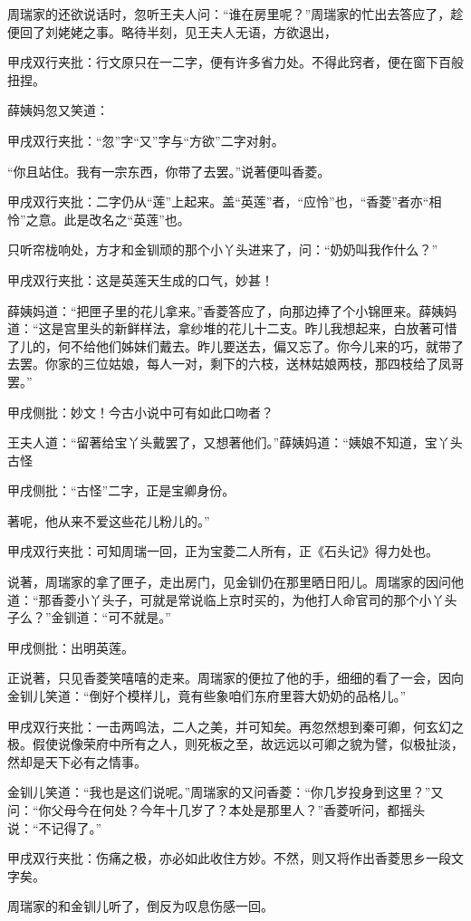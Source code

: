 \begin{parag}
    周瑞家的还欲说话时，忽听王夫人问：“谁在房里呢？”周瑞家的忙出去答应了，趁便回了刘姥姥之事。略待半刻，见王夫人无语，方欲退出，\begin{note}甲戌双行夹批：行文原只在一二字，便有许多省力处。不得此窍者，便在窗下百般扭捏。\end{note}薛姨妈忽又笑道：\begin{note}甲戌双行夹批：“忽”字“又”字与“方欲”二字对射。\end{note}“你且站住。我有一宗东西，你带了去罢。”说著便叫香菱。\begin{note}甲戌双行夹批：二字仍从“莲”上起来。盖“英莲”者，“应怜”也，“香菱”者亦“相怜”之意。此是改名之“英莲”也。\end{note}只听帘栊响处，方才和金钏顽的那个小丫头进来了，问：“奶奶叫我作什么？”\begin{note}甲戌双行夹批：这是英莲天生成的口气，妙甚！\end{note}薛姨妈道：“把匣子里的花儿拿来。”香菱答应了，向那边捧了个小锦匣来。薛姨妈道：“这是宫里头的新鲜样法，拿纱堆的花儿十二支。昨儿我想起来，白放著可惜了儿的，何不给他们姊妹们戴去。昨儿要送去，偏又忘了。你今儿来的巧，就带了去罢。你家的三位姑娘，每人一对，剩下的六枝，送林姑娘两枝，那四枝给了凤哥罢。”\begin{note}甲戌侧批：妙文！今古小说中可有如此口吻者？\end{note}王夫人道：“留著给宝丫头戴罢了，又想著他们。”薛姨妈道：“姨娘不知道，宝丫头古怪\begin{note}甲戌侧批：“古怪”二字，正是宝卿身份。\end{note}著呢，他从来不爱这些花儿粉儿的。”\begin{note}甲戌双行夹批：可知周瑞一回，正为宝菱二人所有，正《石头记》得力处也。\end{note}
\end{parag}


\begin{parag}
    说著，周瑞家的拿了匣子，走出房门，见金钏仍在那里晒日阳儿。周瑞家的因问他道：“那香菱小丫头子，可就是常说临上京时买的，为他打人命官司的那个小丫头子么？”金钏道：“可不就是。”\begin{note}甲戌侧批：出明英莲。\end{note}正说著，只见香菱笑嘻嘻的走来。周瑞家的便拉了他的手，细细的看了一会，因向金钏儿笑道：“倒好个模样儿，竟有些象咱们东府里蓉大奶奶的品格儿。”\begin{note}甲戌双行夹批：一击两鸣法，二人之美，并可知矣。再忽然想到秦可卿，何玄幻之极。假使说像荣府中所有之人，则死板之至，故远远以可卿之貌为譬，似极扯淡，然却是天下必有之情事。\end{note}金钏儿笑道：“我也是这们说呢。”周瑞家的又问香菱：“你几岁投身到这里？”又问：“你父母今在何处？今年十几岁了？本处是那里人？”香菱听问，都摇头说：“不记得了。”\begin{note}甲戌双行夹批：伤痛之极，亦必如此收住方妙。不然，则又将作出香菱思乡一段文字矣。\end{note}周瑞家的和金钏儿听了，倒反为叹息伤感一回。
\end{parag}


